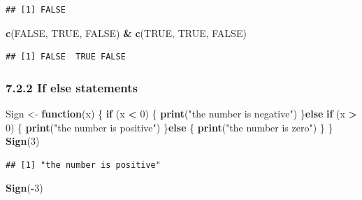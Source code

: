 \documentclass[]{article}
\newenvironment{Shaded}{\begin{snugshade}}{\end{snugshade}}
\newcommand{\KeywordTok}[1]{\textcolor[rgb]{0.13,0.29,0.53}{\textbf{#1}}}
\newcommand{\DecValTok}[1]{\textcolor[rgb]{0.00,0.00,0.81}{#1}}
\newcommand{\StringTok}[1]{\textcolor[rgb]{0.31,0.60,0.02}{#1}}
\newcommand{\OtherTok}[1]{\textcolor[rgb]{0.56,0.35,0.01}{#1}}
\newcommand{\ControlFlowTok}[1]{\textcolor[rgb]{0.13,0.29,0.53}{\textbf{#1}}}
\newcommand{\OperatorTok}[1]{\textcolor[rgb]{0.81,0.36,0.00}{\textbf{#1}}}
\newcommand{\NormalTok}[1]{#1}
\begin{document}
\begin{verbatim}
## [1] FALSE
\end{verbatim}

\begin{Shaded}
\begin{Highlighting}[]
\KeywordTok{c}\NormalTok{(}\OtherTok{FALSE}\NormalTok{, }\OtherTok{TRUE}\NormalTok{, }\OtherTok{FALSE}\NormalTok{) }\OperatorTok{&}\StringTok{ }\KeywordTok{c}\NormalTok{(}\OtherTok{TRUE}\NormalTok{, }\OtherTok{TRUE}\NormalTok{, }\OtherTok{FALSE}\NormalTok{)}
\end{Highlighting}
\end{Shaded}

\begin{verbatim}
## [1] FALSE  TRUE FALSE
\end{verbatim}

\subsubsection{7.2.2 If else statements}\label{if-else-statements}

\begin{Shaded}
\begin{Highlighting}[]
\NormalTok{Sign <-}\StringTok{ }\ControlFlowTok{function}\NormalTok{(x) \{}
  \ControlFlowTok{if}\NormalTok{ (x }\OperatorTok{<}\StringTok{ }\DecValTok{0}\NormalTok{) \{}
     \KeywordTok{print}\NormalTok{(}\StringTok{"the number is negative"}\NormalTok{)}
\NormalTok{  \}}\ControlFlowTok{else} \ControlFlowTok{if}\NormalTok{ (x }\OperatorTok{>}\StringTok{ }\DecValTok{0}\NormalTok{) \{}
    \KeywordTok{print}\NormalTok{(}\StringTok{"the number is positive"}\NormalTok{)}
\NormalTok{  \}}\ControlFlowTok{else}\NormalTok{ \{}
    \KeywordTok{print}\NormalTok{(}\StringTok{"the number is zero"}\NormalTok{)}
\NormalTok{  \}}
\NormalTok{\}}
\KeywordTok{Sign}\NormalTok{(}\DecValTok{3}\NormalTok{)}
\end{Highlighting}
\end{Shaded}

\begin{verbatim}
## [1] "the number is positive"
\end{verbatim}

\begin{Shaded}
\begin{Highlighting}[]
\KeywordTok{Sign}\NormalTok{(}\OperatorTok{-}\DecValTok{3}\NormalTok{)}
\end{Highlighting}
\end{Shaded}
\end{document}
